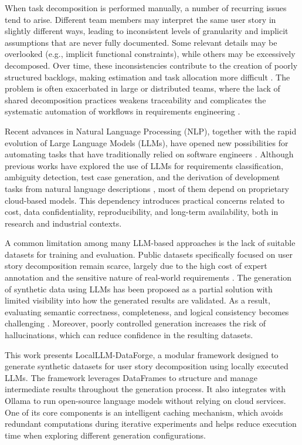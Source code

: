 \documentclass[pdflatex,sn-mathphys-num]{sn-jnl}
\theoremstyle{thmstyleone}%
\theoremstyle{thmstyletwo}%
\theoremstyle{thmstylethree}%
\begin{document}
When task decomposition is performed manually, a number of recurring issues tend to arise. Different team members may interpret the same user story in slightly different ways, leading to inconsistent levels of granularity and implicit assumptions that are never fully documented. Some relevant details may be overlooked (e.g., implicit functional constraints), while others may be excessively decomposed. Over time, these inconsistencies contribute to the creation of poorly structured backlogs, making estimation and task allocation more difficult \cite{lucassen2016}. The problem is often exacerbated in large or distributed teams, where the lack of shared decomposition practices weakens traceability and complicates the systematic automation of workflows in requirements engineering \cite{gorschek2006}.

Recent advances in Natural Language Processing (NLP), together with the rapid evolution of Large Language Models (LLMs), have opened new possibilities for automating tasks that have traditionally relied on software engineers \cite{chen2021, white2023}. Although previous works have explored the use of LLMs for requirements classification, ambiguity detection, test case generation, and the derivation of development tasks from natural language descriptions \cite{rahimi2023, sebban2024}, most of them depend on proprietary cloud-based models. This dependency introduces practical concerns related to cost, data confidentiality, reproducibility, and long-term availability, both in research and industrial contexts.

A common limitation among many LLM-based approaches is the lack of suitable datasets for training and evaluation. Public datasets specifically focused on user story decomposition remain scarce, largely due to the high cost of expert annotation and the sensitive nature of real-world requirements \cite{fucci2020}. The generation of synthetic data using LLMs has been proposed as a partial solution with limited visibility into how the generated results are validated. As a result, evaluating semantic correctness, completeness, and logical consistency becomes challenging \cite{liu2023}. Moreover, poorly controlled generation increases the risk of hallucinations, which can reduce confidence in the resulting datasets.

This work presents LocalLLM-DataForge, a modular framework designed to generate synthetic datasets for user story decomposition using locally executed LLMs. The framework leverages DataFrames to structure and manage intermediate results throughout the generation process. It also integrates with Ollama to run open-source language models without relying on cloud services. One of its core components is an intelligent caching mechanism, which avoids redundant computations during iterative experiments and helps reduce execution time when exploring different generation configurations.
\end{document}
